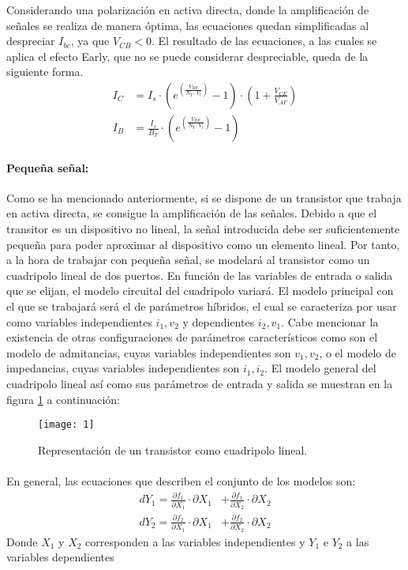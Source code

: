 Considerando una polarización en activa directa, donde la amplificación de señales se realiza de manera óptima, las ecuaciones quedan simplificadas al despreciar $I_{bc}$, ya que $V_{CB} < 0$. El resultado de las ecuaciones, a las cuales se aplica el efecto Early, que no se puede considerar despreciable, queda de la siguiente forma. 
\begin{align} 
   \label{eq:1}
   I_C &= I_s \cdot \left(e^{\left(\frac {V_{BE}}{N_{T} \cdot V_t} \right)} - 1\right) \cdot \left(1 + \frac{V_{CE}} {V_{AF}} \right)\\ 
   \label{eq:2}
   I_B &= \frac{I_s}{B_F} \cdot \left(e^{\left(\frac {V_{BE}}{N_{T} \cdot V_t} \right)} - 1\right)
\end{align}

\paragraph{Pequeña señal:}
Como se ha mencionado anteriormente, si se dispone de un transistor que trabaja en activa directa, se consigue la amplificación de las señales. 
Debido a que el transitor es un dispositivo no lineal, la señal introducida debe ser suficientemente pequeña para poder aproximar al dispositivo como un elemento lineal.
Por tanto, a la hora de trabajar con pequeña señal, se modelará al transistor como un cuadripolo lineal de dos puertos. 
En función de las variables de entrada o salida que se elijan, el modelo circuital del cuadripolo variará. El modelo principal con el que se trabajará será el de parámetros híbridos, el cual se caracteriza por usar como variables independientes $i_1, v_2$ y dependientes $i_2, v_1$. Cabe mencionar la existencia de otras configuraciones de parámetros característicos como son el modelo de admitancias, cuyas variables independientes son $v_1, v_2$, o el modelo de impedancias, cuyas variables independientes son $i_1, i_2$.
El modelo general del cuadripolo lineal así como sus parámetros de entrada y salida se muestran en la figura \ref{fig:1} a continuaci\'on:
\begin{figure}[h]
    \centering
    \texttt{[image: 1]}
    \caption{Representación de un transistor como cuadripolo lineal.}
    \label{fig:1}
\end{figure}
\paragraph{}
En general, las ecuaciones que describen el conjunto de los modelos son:
\begin{align} 
   dY_1 = \frac {\partial f_1}{\partial X_1} \cdot \partial X_1 &+ \frac {\partial f_1}{\partial X_2} \cdot \partial X_2 \\ 
   dY_2 = \frac {\partial f_2}{\partial X_1} \cdot \partial X_1 &+ \frac {\partial f_2}{\partial X_2} \cdot \partial X_2 
\end{align}
Donde $X_1$ y $X_2$ corresponden a las variables independientes y $Y_1$ e $Y_2$ a las variables dependientes\\
